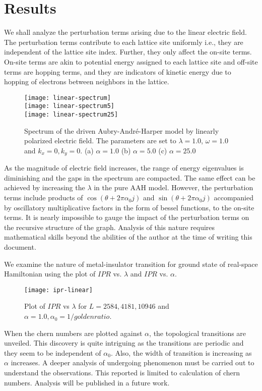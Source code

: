 \section{Results}
We shall analyze the perturbation terms arising due to the linear electric field. The perturbation terms contribute to each lattice site uniformly i.e., they are independent of
the lattice site index. Further, they only affect the on-site terms. On-site terms are akin to potential energy assigned to each lattice site and off-site terms are hopping terms,
and they are indicators of kinetic energy due to hopping of electrons between neighbors in the lattice.

\begin{figure}[t]
 \centering
 \texttt{[image: linear-spectrum]}\\
 \texttt{[image: linear-spectrum5]}\\
 \texttt{[image: linear-spectrum25]}
 \caption{Spectrum of the driven Aubry-Andr\'e-Harper model by linearly polarized electric field. The parameters are set to $\lambda=1.0$, $\omega=1.0$ and $k_x=0, k_y=0$.
 (a) $\alpha = 1.0$ (b) $\alpha = 5.0$ (c) $\alpha = 25.0$}
\end{figure}

As the magnitude of electric field increases, the range of energy eigenvalues is diminishing and the gaps in the spectrum are compacted. The same effect can be achieved by increasing
the $\lambda$ in the pure AAH model. However, the perturbation terms include products of $\cos(\theta + 2\pi\alpha_0 j)$ and $\sin(\theta + 2\pi\alpha_0 j)$ accompanied by
oscillatory multiplicative factors in the form of bessel functions, to the on-site terms. It is nearly impossible to gauge the impact of the perturbation terms on
the recursive structure of the graph. Analysis of this nature requires mathematical skills beyond the abilities of the author at the time of writing this document.

We examine the nature of metal-insulator transition for ground state of real-space Hamiltonian using the plot of $IPR$ vs. $\lambda$ and $IPR$ vs. $\alpha$.
\begin{figure}[h]
 \centering
 \texttt{[image: ipr-linear]}
 \caption{Plot of $IPR$ vs $\lambda$ for $L=2584,4181,10946$ and  $\alpha=1.0, \alpha_0=1/goldenratio$.}
\end{figure}

When the chern numbers are plotted against $\alpha$, the topological transitions are unveiled. This discovery is quite intriguing as the transitions are periodic and they seem to
be independent of $\alpha_0$. Also, the width of transition is increasing as $\alpha$ increases. A deeper analysis of undergoing phenomenon must be carried out to understand the 
observations. This reported is limited to calculation of chern numbers. Analysis will be published in a future work.

